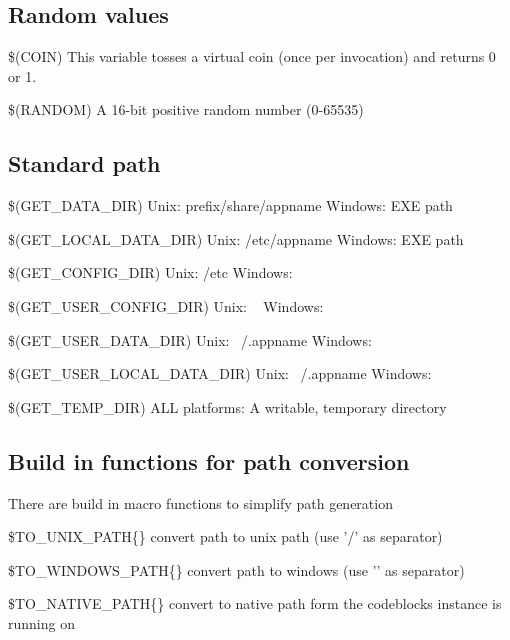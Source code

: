 \subsection{Random values}

\begin{codeentry}
\item[\$(COIN)] This variable tosses a virtual coin (once per invocation) and returns 0 or 1.
\item[\$(RANDOM)] A 16-bit positive random number (0-65535)
\end{codeentry}

\subsection{Standard path}

\begin{codeentry}
\item[\$(GET\_DATA\_DIR)] Unix: prefix/share/appname Windows: EXE path
\item[\$(GET\_LOCAL\_DATA\_DIR)] Unix: /etc/appname Windows: EXE path
\item[\$(GET\_CONFIG\_DIR)] Unix: /etc Windows: 
\item[\$(GET\_USER\_CONFIG\_DIR)] Unix: ~ Windows: 
\item[\$(GET\_USER\_DATA\_DIR)] Unix: ~/.appname Windows: 
\item[\$(GET\_USER\_LOCAL\_DATA\_DIR)] Unix: ~/.appname Windows: 
\item[\$(GET\_TEMP\_DIR)] ALL platforms: A writable, temporary directory
\end{codeentry}

\subsection{Build in functions for path conversion}
There are build in macro functions to simplify path generation 
\begin{codeentry}
\item[\$TO\_UNIX\_PATH\{\}] convert path to unix path (use '/' as separator)
\item[\$TO\_WINDOWS\_PATH\{\}] convert path to windows (use '\osp' as separator)
\item[\$TO\_NATIVE\_PATH\{\}] convert to native path form the codeblocks instance is running on
\end{codeentry}


